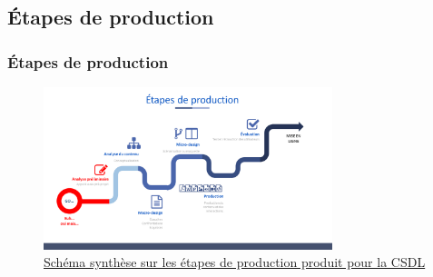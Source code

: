 					
					
					 \subsection{Étapes de production}
					  
						\begin{frame}[allowframebreaks]
						\frametitle{Étapes de production}
						\begin{figure}
                     			\centering
                    			 \includegraphics[width = 0.75\textwidth]{etapes.png}
                     			\caption{\tiny{\href{run:etapes.png}{Schéma synthèse sur les étapes de production produit pour la CSDL}}}
                   			\end{figure}
                   			

\end{frame}
